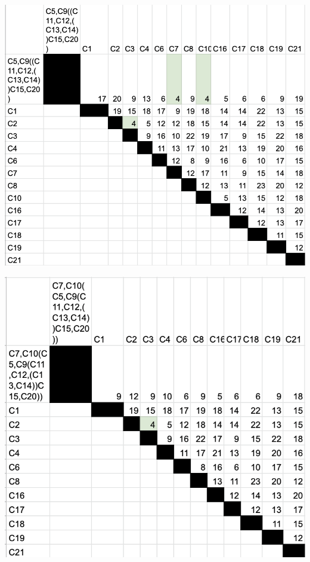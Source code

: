 \documentclass[a4paper,table,xcdraw]{article}
\begin{document}
\includegraphics[scale=0.8]{./img/carac6.png}

\includegraphics[scale=0.8]{./img/carac7.png}
\end{document}

